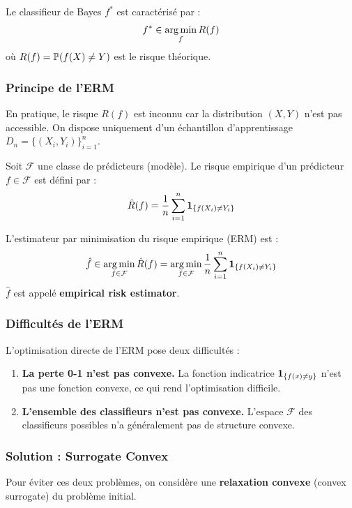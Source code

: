 Le classifieur de Bayes $f^*$ est caractérisé par :
\[
f^* \in \operatorname*{arg\,min}_f R(f)
\]
où $R(f) = \mathbb{P}(f(X) \neq Y)$ est le risque théorique.

\subsubsection{Principe de l'ERM}

En pratique, le risque $R(f)$ est inconnu car la distribution $(X,Y)$ n'est pas accessible. On dispose uniquement d'un échantillon d'apprentissage $D_n = \{(X_i, Y_i)\}_{i=1}^n$.

\begin{definition}
Soit $\mathcal{F}$ une classe de prédicteurs (modèle). Le risque empirique d'un prédicteur $f \in \mathcal{F}$ est défini par :
\[
\hat{R}(f) = \frac{1}{n} \sum_{i=1}^n \mathbf{1}_{\{f(X_i) \neq Y_i\}}
\]
\end{definition}

L'estimateur par minimisation du risque empirique (ERM) est :
\[
\hat{f} \in \operatorname*{arg\,min}_{f \in \mathcal{F}} \hat{R}(f) = \operatorname*{arg\,min}_{f \in \mathcal{F}} \frac{1}{n} \sum_{i=1}^n \mathbf{1}_{\{f(X_i) \neq Y_i\}}
\]
$\hat{f}$ est appelé \textbf{empirical risk estimator}.

\subsubsection{Difficultés de l'ERM}

\begin{remarque}
L'optimisation directe de l'ERM pose deux difficultés :
\begin{enumerate}
    \item \textbf{La perte 0-1 n'est pas convexe.} La fonction indicatrice $\mathbf{1}_{\{f(x) \neq y\}}$ n'est pas une fonction convexe, ce qui rend l'optimisation difficile.
    \item \textbf{L'ensemble des classifieurs n'est pas convexe.} L'espace $\mathcal{F}$ des classifieurs possibles n'a généralement pas de structure convexe.
\end{enumerate}
\end{remarque}

\subsubsection{Solution : Surrogate Convex}

Pour éviter ces deux problèmes, on considère une \textbf{relaxation convexe} (convex surrogate) du problème initial.

